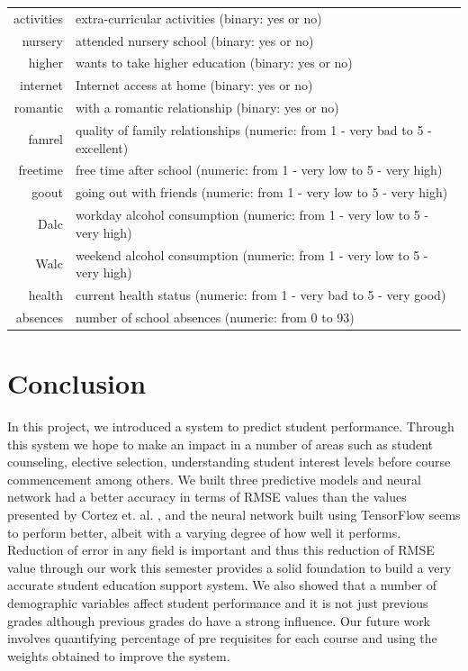 \documentclass[conference]{IEEEtran}
\begin{document}
\begin{table}[!t]
\begin{tabular}{|r || l|}
activities & extra-curricular activities (binary: yes or no)\\
nursery & attended nursery school (binary: yes or no)\\
higher & wants to take higher education (binary: yes or no)\\
internet & Internet access at home (binary: yes or no)\\
romantic & with a romantic relationship (binary: yes or no)\\
famrel & quality of family relationships (numeric: from 1 - very bad to 5 - excellent)\\
freetime & free time after school (numeric: from 1 - very low to 5 - very high)\\
goout & going out with friends (numeric: from 1 - very low to 5 - very high)\\
Dalc & workday alcohol consumption (numeric: from 1 - very low to 5 - very high)\\
Walc & weekend alcohol consumption (numeric: from 1 - very low to 5 - very high)\\
health & current health status (numeric: from 1 - very bad to 5 - very good)\\
absences & number of school absences (numeric: from 0 to 93)\\
\hline
\end{tabular}
\end{table}

	\section{Conclusion}
In this project, we introduced a system to predict student performance. Through this system we hope to make an impact in a number of areas such as student counseling, elective selection, understanding student interest levels before course commencement among others. We built three predictive models and neural network had a better accuracy in terms of RMSE values than the values presented by Cortez et. al. \cite{ref:4}, and the neural network built using TensorFlow \cite{tensorflow2015-whitepaper} seems to perform better, albeit with a varying degree of how well it performs. Reduction of error in any field is important and thus this reduction of RMSE value through our work this semester provides a solid foundation to build a very accurate student education support system. We also showed that a number of demographic variables affect student performance and it is not just previous grades although previous grades do have a strong influence. Our future work involves quantifying percentage of pre requisites for each course and using the weights obtained to improve the system.
\end{document}
